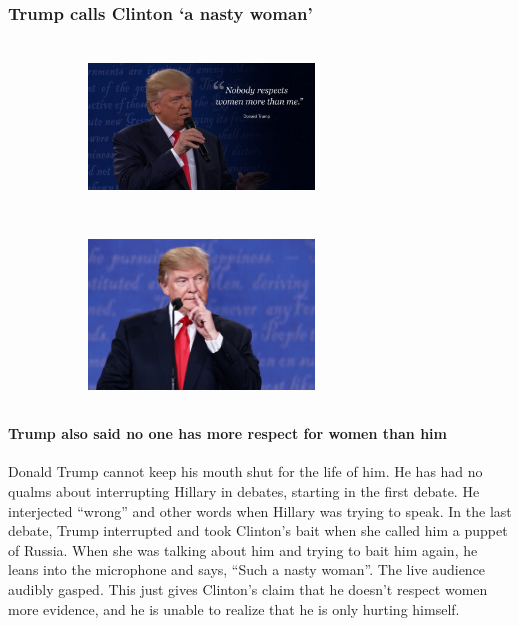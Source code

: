 \documentclass[twoside]{article}
\begin{document}
              \subsubsection{Trump calls Clinton `a nasty woman'}
              \vskip0.5cm
              \begin{figure}[H]
                \centering
                \begin{subfigure}{.4\textwidth}
                  \centering
                  \includegraphics[width=6cm,height=4.5cm,keepaspectratio]{images/articles/trump1.jpg}
                  \end{subfigure}%
                  \begin{subfigure}{.4\textwidth}
                    \centering
                    \includegraphics[width=6cm,height=4.5cm,keepaspectratio]{images/articles/trump2.jpg}
                    \end{subfigure}%
                  \end{figure}
              \paragraph{Trump also said no one has more respect for women than him} Donald Trump cannot keep his mouth shut for the life of him. He has had no qualms about interrupting Hillary in debates, starting in the first debate. He interjected “wrong” and other words when Hillary was trying to speak. In the last debate, Trump interrupted and took Clinton’s bait when she called him a puppet of Russia. When she was talking about him and trying to bait him again, he leans into the microphone and says, “Such a nasty woman”. The live audience audibly gasped. This just gives Clinton’s claim that he doesn’t respect women more evidence, and he is unable to realize that he is only hurting himself.
              \newpage
\end{document}
